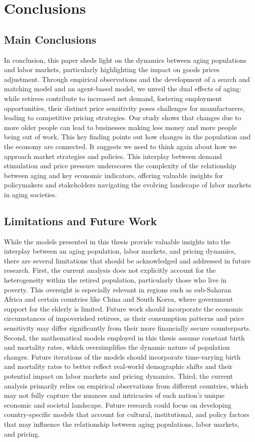\documentclass[ %
    final,
    scrbook,
    listoffigures,
    listoftables, 
    glossary]{cu-thesis}
\begin{document}
\chapter{Conclusions}
\section{Main Conclusions}
In conclusion, this paper sheds light on the dynamics between aging populations and labor markets, particularly highlighting the impact on goods prices adjustment. Through empirical observations and the development of a search and matching model and an agent-based model, we unveil the dual effects of aging: while retirees contribute to increased net demand, fostering employment opportunities, their distinct price sensitivity poses challenges for manufacturers, leading to competitive pricing strategies. Our study shows that changes due to more older people can lead to businesses making less money and more people being out of work. This key finding points out how changes in the population and the economy are connected. It suggests we need to think again about how we approach market strategies and policies. This interplay between demand stimulation and price pressure underscores the complexity of the relationship between aging and key economic indicators, offering valuable insights for policymakers and stakeholders navigating the evolving landscape of labor markets in aging societies.
\section{Limitations and Future Work}
While the models presented in this thesis provide valuable insights into the interplay between an aging population, labor markets, and pricing dynamics, there are several limitations that should be acknowledged and addressed in future research.
First, the current analysis does not explicitly account for the heterogeneity within the retired population, particularly those who live in poverty. This oversight is especially relevant in regions such as sub-Saharan Africa and certain countries like China and South Korea, where government support for the elderly is limited. Future work should incorporate the economic circumstances of impoverished retirees, as their consumption patterns and price sensitivity may differ significantly from their more financially secure counterparts.
Second, the mathematical models employed in this thesis assume constant birth and mortality rates, which oversimplifies the dynamic nature of population changes. Future iterations of the models should incorporate time-varying birth and mortality rates to better reflect real-world demographic shifts and their potential impact on labor markets and pricing dynamics.
Third, the current analysis primarily relies on empirical observations from different countries, which may not fully capture the nuances and intricacies of each nation's unique economic and societal landscape. Future research could focus on developing country-specific models that account for cultural, institutional, and policy factors that may influence the relationship between aging populations, labor markets, and pricing.
\end{document}
